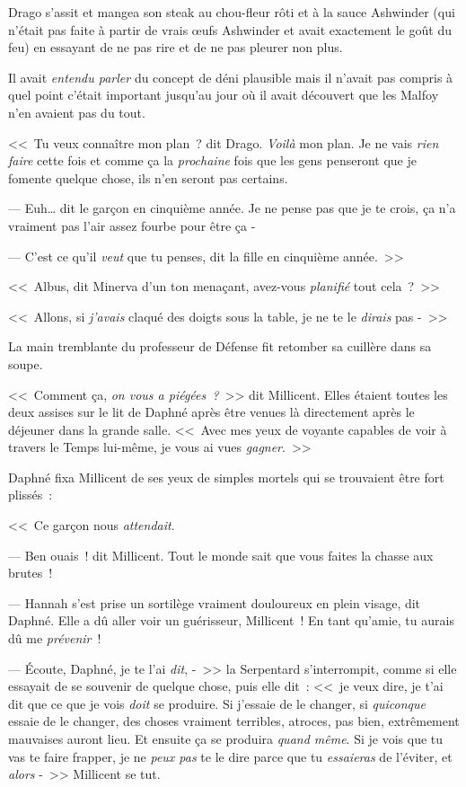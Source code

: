 \later

Drago s'assit et mangea son steak au chou-fleur rôti et à la sauce Ashwinder (qui n'était pas faite à partir de vrais œufs Ashwinder et avait exactement le goût du feu) en essayant de ne pas rire et de ne pas pleurer non plus.

Il avait \emph{entendu parler} du concept de déni plausible mais il n'avait pas compris à quel point c'était important jusqu'au jour où il avait découvert que les Malfoy n'en avaient pas du tout.

<<~Tu veux connaître mon plan~? dit Drago. \emph{Voilà} mon plan. Je ne vais \emph{rien faire} cette fois et comme ça la \emph{prochaine} fois que les gens penseront que je fomente quelque chose, ils n'en seront pas certains.

--- Euh… dit le garçon en cinquième année. Je ne pense pas que je te crois, ça n'a vraiment pas l'air assez fourbe pour être ça -

--- C'est ce qu'il \emph{veut} que tu penses, dit la fille en cinquième année.~>>

\later

<<~Albus, dit Minerva d'un ton menaçant, avez-vous \emph{planifié} tout cela~?~>>

\later

<<~Allons, si \emph{j'avais} claqué des doigts sous la table, je ne te le \emph{dirais} pas -~>>

\later

La main tremblante du professeur de Défense fit retomber sa cuillère dans sa soupe.

\later

<<~Comment ça, \emph{on vous a piégées~?}~>> dit Millicent. Elles étaient toutes les deux assises sur le lit de Daphné après être venues là directement après le déjeuner dans la grande salle. <<~Avec mes yeux de voyante capables de voir à travers le Temps lui-même, je vous ai vues \emph{gagner}.~>>

Daphné fixa Millicent de ses yeux de simples mortels qui se trouvaient être fort plissés~:

<<~Ce garçon nous \emph{attendait}.

--- Ben ouais~! dit Millicent. Tout le monde sait que vous faites la chasse aux brutes~!

--- Hannah s'est prise un sortilège vraiment douloureux en plein visage, dit Daphné. Elle a dû aller voir un guérisseur, Millicent~! En tant qu'amie, tu aurais dû me \emph{prévenir}~!

--- Écoute, Daphné, je te l'ai \emph{dit}, -~>> la Serpentard s'interrompit, comme si elle essayait de se souvenir de quelque chose, puis elle dit~: <<~je veux dire, je t'ai dit que ce que je vois \emph{doit} se produire. Si j'essaie de le changer, si \emph{quiconque} essaie de le changer, des choses vraiment terribles, atroces, pas bien, extrêmement mauvaises auront lieu. Et ensuite ça se produira \emph{quand même}. Si je vois que tu vas te faire frapper, je ne \emph{peux pas} te le dire parce que tu \emph{essaieras} de l'éviter, et \emph{alors} -~>> Millicent se tut.

